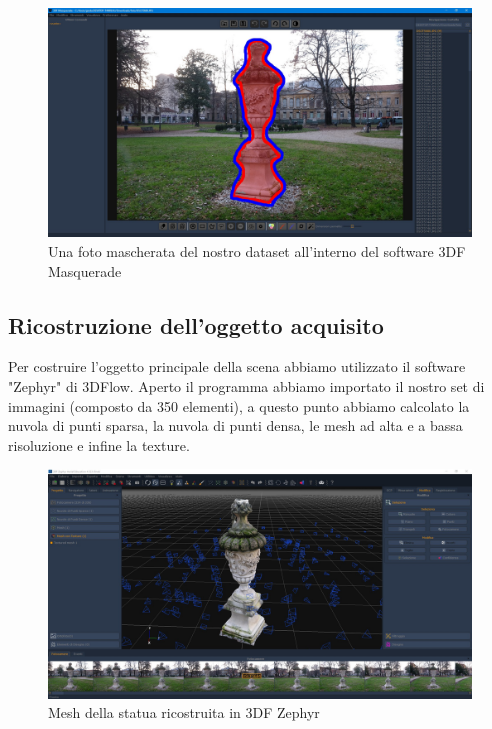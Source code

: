 \documentclass[12pt]{report}
\begin{document}
\begin{figure}[H]
    \centering
    \includegraphics[width = \linewidth]{img/Mascherata.jpg}
    \caption{Una foto mascherata del nostro dataset all'interno del software 3DF Masquerade}
\end{figure}

\subsection{Ricostruzione dell'oggetto acquisito}
Per costruire l'oggetto principale della scena abbiamo utilizzato il software "Zephyr" di 3DFlow.
Aperto il programma abbiamo importato il nostro set di immagini (composto da 350 elementi), a questo punto abbiamo calcolato la nuvola di punti sparsa, la nuvola di punti densa, le mesh ad alta e a bassa risoluzione e infine la texture.
\begin{figure}[H]
    \centering
\includegraphics[width = \linewidth]{img/3DF_Zephyr_c.jpg}
    \caption{Mesh della statua ricostruita in 3DF Zephyr}
\end{figure}
\end{document}
